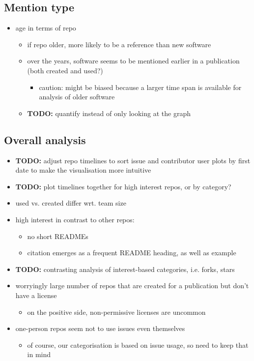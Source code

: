 \documentclass[10pt,a4paper]{scrartcl}
\begin{document}
\subsection*{Mention type}

\begin{itemize}
    \item age in terms of repo
    \begin{itemize}
        \item if repo older, more likely to be a reference than new software
        \item over the years, software seems to be mentioned earlier in a publication (both created and used?)
        \begin{itemize}
            \item caution: might be biased because a larger time span is available for analysis of older software
        \end{itemize}
        \item \textbf{TODO: }quantify instead of only looking at the graph
    \end{itemize}
\end{itemize}

\subsection*{Overall analysis}
\begin{itemize}
    \item \textbf{TODO: }adjust repo timelines to sort issue and contributor user plots by first date to make the visualisation more intuitive
    \item \textbf{TODO: }plot timelines together for high interest repos, or by category?
\end{itemize}

\begin{itemize}
    \item used vs. created differ wrt. team size
    \item high interest in contrast to other repos:
    \begin{itemize}
        \item no short READMEs
        \item citation emerges as a frequent README heading, as well as example
    \end{itemize}
    \item \textbf{TODO: }contrasting analysis of interest-based categories, i.e. forks, stars
    \item worryingly large number of repos that are created for a publication but don't have a license
    \begin{itemize}
        \item on the positive side, non-permissive licenses are uncommon
    \end{itemize}
    \item one-person repos seem not to use issues even themselves
    \begin{itemize}
        \item of course, our categorisation is based on issue usage, so need to keep that in mind
    \end{itemize}
\end{itemize}
\end{document}
